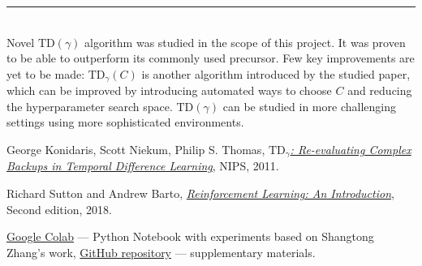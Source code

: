 \documentclass[a0]{a0poster}
\def\Head#1{\noindent{\LARGE\color{bluegray} #1}\bigskip}
\begin{document}
\begin{textblock}{7.0}
\medskip
\hrule\medskip
\Head{Conclusion \& Future Work}\\

Novel $\text{TD}(\gamma)$ algorithm was studied in the scope of this project.
It was proven to be able to outperform its commonly used precursor. Few key
improvements are yet to be made: $\text{TD}_{\gamma}(C)$ is another algorithm
introduced by the studied paper, which can be improved by introducing automated
ways to choose $C$ and reducing the hyperparameter search space.
$\text{TD}(\gamma)$ can be studied in more challenging settings using more
sophisticated environments.

\begin{thebibliography}{9}

  George Konidaris, Scott Niekum, Philip S. Thomas,
  \href{https://papers.nips.cc/paper/4472-td_gamma-re-evaluating-complex-backups-in-temporal-difference-learning.pdf}{\color{blue}
  \textit{$\text{TD}_{\gamma}$: Re-evaluating Complex Backups in Temporal
          Difference Learning}},
  NIPS,
  2011.

  Richard Sutton and Andrew Barto,
  \href{http://incompleteideas.net/book/the-book-2nd.html}{\color{blue}\textit{Reinforcement Learning: An Introduction}},
  Second edition,
  2018.

  \href{https://colab.research.google.com/gist/kbobyrev/90efb074a4740f8a8a6abf22e58d988a/td-gamma.ipynb}{\color{blue}Google Colab} ---
  Python Notebook with experiments based on Shangtong Zhang's work,
  \href{https://github.com/omtcvxyz/td-gamma}{\color{blue}GitHub repository} --- supplementary materials.

\end{thebibliography}

\end{textblock}
\end{document}

